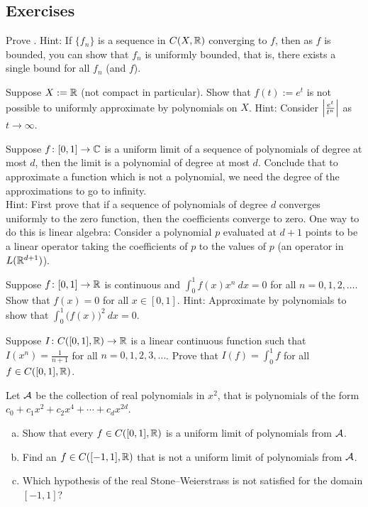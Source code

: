 \subsection{Exercises}

\begin{exercise}
Prove .
Hint: If $\{ f_n \}$ is a sequence in $C(X,{\mathbb{R}})$
converging to $f$, then as $f$ is bounded, you can show
that $f_n$ is uniformly bounded, that is, there exists a
single bound for all $f_n$ (and $f$).
\end{exercise}

\begin{exercise}
Suppose $X := {\mathbb{R}}$ (not compact in particular).
Show that $f(t) := e^t$ is not possible to uniformly approximate
by polynomials on $X$.  Hint: Consider $\left\lvert {\frac{e^t}{t^n}} \right\rvert$
as $t \to \infty$.
\end{exercise}

\begin{exercise}
Suppose $f \colon [0,1] \to {\mathbb{C}}$ is a uniform limit of a sequence of polynomials
of degree at most $d$, then the limit is a polynomial of degree at most $d$.
Conclude that to approximate a function which is not a polynomial, we
need the degree of the approximations to go to infinity.\\
Hint: First prove that if a sequence of polynomials of degree $d$
converges uniformly to the zero function, then 
the coefficients converge to zero.
One way to do this is linear algebra: Consider a polynomial $p$
evaluated at $d+1$ points
to be a linear operator taking the
coefficients of $p$ to the values of $p$
(an operator in $L({\mathbb{R}}^{d+1})$).
\end{exercise}

\begin{exercise}
Suppose $f \colon [0,1] \to {\mathbb{R}}$ is continuous and
$\int_0^1 f(x) x^n ~dx = 0$ for all $n = 0,1,2,\ldots$.
Show that $f(x) = 0$ for all $x \in [0,1]$.
Hint: Approximate by polynomials to show that $\int_0^1 {\bigl( f(x)
\bigr)}^2 ~ dx = 0$.
\end{exercise}

\begin{exercise}
Suppose $I \colon C([0,1],{\mathbb{R}}) \to {\mathbb{R}}$ is 
a linear continuous function such that
$I(x^n) = \frac{1}{n+1}$
for all $n=0,1,2,3,\ldots$.
Prove that $I(f) = \int_0^1 f$ for all $f \in C([0,1],{\mathbb{R}})$.
\end{exercise}

\begin{exercise}
Let ${\mathcal{A}}$ be the collection of real polynomials in $x^2$,
that is polynomials of the form
$c_0 + c_1 x^2 + c_2 x^4 + \cdots + c_d x^{2d}$.
\begin{enumerate}[a)]
\item
Show that every $f \in C([0,1],{\mathbb{R}})$ is a uniform limit of
polynomials from ${\mathcal{A}}$.
\item
Find an $f \in  C([-1,1],{\mathbb{R}})$ that is not a
uniform limit of
polynomials from ${\mathcal{A}}$.
\item
Which hypothesis of the real Stone--Weierstrass is not satisfied
for the domain $[-1,1]$?
\end{enumerate}
\end{exercise}

